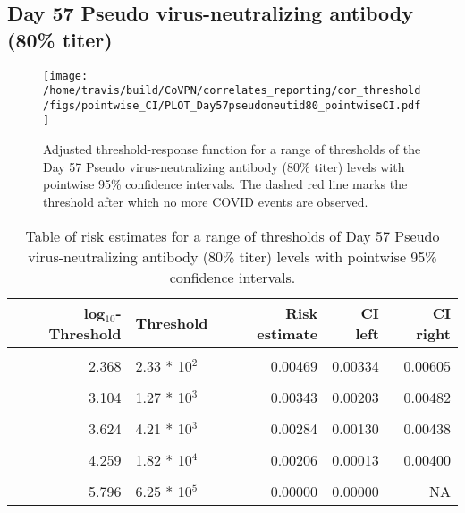 \documentclass[]{book}
\theoremstyle{definition}
\theoremstyle{definition}
\theoremstyle{definition}
\newcommand{\1}{\mathbbm{1}}
\begin{document}
\newpage

\newpage

\newpage

\hypertarget{day-57-pseudo-virus-neutralizing-antibody-80-titer}{%
\subsection{Day 57 Pseudo virus-neutralizing antibody (80\% titer)}\label{day-57-pseudo-virus-neutralizing-antibody-80-titer}}

\begin{figure}[H]
\centering
\texttt{[image: /home/travis/build/CoVPN/correlates\_reporting/cor\_threshold/figs/pointwise\_CI/PLOT\_Day57pseudoneutid80\_pointwiseCI.pdf]}
\caption{Adjusted threshold-response function for a range of thresholds of the
  Day 57 Pseudo virus-neutralizing antibody (80\% titer) levels with pointwise 95\% confidence intervals. The dashed red line marks the threshold after which no more COVID events are observed. }
\end{figure}
\begin{table}[!h]

\caption{\label{tab:unnamed-chunk-353}Table of risk estimates for a range of thresholds of Day 57 Pseudo virus-neutralizing antibody (80\% titer) levels with pointwise 95\% confidence intervals.}
\centering
\begin{tabular}[t]{rlrrr}
\toprule
log$_{10}$-Threshold & Threshold & Risk estimate & CI left & CI right\\
\midrule
\cellcolor{gray!6}{1.289} & \cellcolor{gray!6}{1.95 * 10$^1$} & \cellcolor{gray!6}{0.00514} & \cellcolor{gray!6}{0.00381} & \cellcolor{gray!6}{0.00647}\\
2.368 & 2.33 * 10$^2$ & 0.00469 & 0.00334 & 0.00605\\
\cellcolor{gray!6}{2.755} & \cellcolor{gray!6}{5.69 * 10$^2$} & \cellcolor{gray!6}{0.00428} & \cellcolor{gray!6}{0.00290} & \cellcolor{gray!6}{0.00565}\\
3.104 & 1.27 * 10$^3$ & 0.00343 & 0.00203 & 0.00482\\
\cellcolor{gray!6}{3.373} & \cellcolor{gray!6}{2.36 * 10$^3$} & \cellcolor{gray!6}{0.00310} & \cellcolor{gray!6}{0.00169} & \cellcolor{gray!6}{0.00452}\\
3.624 & 4.21 * 10$^3$ & 0.00284 & 0.00130 & 0.00438\\
\cellcolor{gray!6}{3.909} & \cellcolor{gray!6}{8.11 * 10$^3$} & \cellcolor{gray!6}{0.00244} & \cellcolor{gray!6}{0.00085} & \cellcolor{gray!6}{0.00404}\\
4.259 & 1.82 * 10$^4$ & 0.00206 & 0.00013 & 0.00400\\
\cellcolor{gray!6}{4.676} & \cellcolor{gray!6}{4.74 * 10$^4$} & \cellcolor{gray!6}{0.00256} & \cellcolor{gray!6}{0.00000} & \cellcolor{gray!6}{0.00567}\\
5.796 & 6.25 * 10$^5$ & 0.00000 & 0.00000 & NA\\
\bottomrule
\end{tabular}
\end{table}
\end{document}
